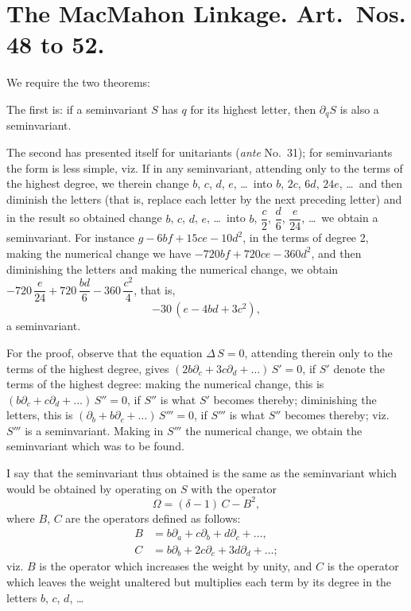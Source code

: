 \documentclass[11pt,a4paper]{book}
\begin{document}
\section*{The MacMahon Linkage. Art.~Nos. \textbf{48} to \textbf{52}.}

\setcounter{art}{47}
\begin{art}
We require the two theorems:

The first is: if a seminvariant $S$ has $q$ for its highest letter, then $\partial_{q}S$ is also a seminvariant.

The second has presented itself for unitariants (\textit{ante} No.~31); for seminvariants the form is less simple, viz. If in any seminvariant, attending only to the terms of the highest degree, we therein change $b$, $c$, $d$, $e$, \ldots\ into $b$, $2c$, $6d$, $24e$, \ldots\ and then diminish the letters (that is, replace each letter by the next preceding letter) and in the result so obtained change $b$, $c$, $d$, $e$, \ldots\ into $b$, $\dfrac{c}{2}$, $\dfrac{d}{6}$, $\dfrac{e}{24}$, \ldots\ we obtain a seminvariant. For instance $g - 6bf + 15ce - 10d^{2}$, in the terms of degree 2, making the numerical change we have $-720bf + 720ce - 360d^{2}$, and then diminishing the letters and making the numerical change, we obtain $-720\,\dfrac{e}{24} + 720\,\dfrac{bd}{6} - 360\,\dfrac{c^{2}}{4}$, that is,
\[
-30\,(e - 4bd + 3c^{2}),
\]
a seminvariant.
\end{art}

\setcounter{art}{48}
\begin{art}
For the proof, observe that the equation $\Delta\,S = 0$, attending therein only to the terms of the highest degree, gives $(2b\partial_{c} + 3c\partial_{d} + \ldots)\,S' = 0$, if $S'$ denote the terms of the highest degree: making the numerical change, this is $(b\partial_{c} + c\partial_{d} + \ldots)\,S'' = 0$, if $S''$ is what $S'$ becomes thereby; diminishing the letters, this is $(\partial_{b} + b\partial_{c} + \ldots)\,S''' = 0$, if $S'''$ is what $S''$ becomes thereby; viz. $S'''$ is a seminvariant. Making in $S'''$ the numerical change, we obtain the seminvariant which was to be found.
\end{art}

\setcounter{art}{49}
\begin{art}
I say that the seminvariant thus obtained is the same as the seminvariant which would be obtained by operating on $S$ with the operator
\[
\Omega = (\delta - 1)\,C - B^{2},
\]
where $B$, $C$ are the operators defined as follows:
\begin{align*}
B &= b\partial_{a} + c\partial_{b} + d\partial_{c} + \ldots,\\
C &= b\partial_{b} + 2c\partial_{c} + 3d\partial_{d} + \ldots;
\end{align*}
viz. $B$ is the operator which increases the weight by unity, and $C$ is the operator which leaves the weight unaltered but multiplies each term by its degree in the letters $b$, $c$, $d$, \ldots
\end{art}
\end{document}
